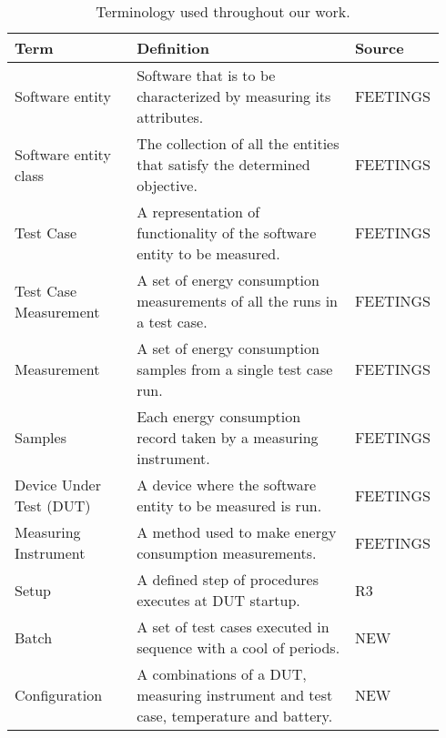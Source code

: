 
\begin{table}[ht]
    \begin{tabular}{| p{0.29\linewidth} | p{0.5\linewidth}| p{0.15\linewidth}|}
        \hline
        \textbf{Term}           & \textbf{Definition}                                                       & \textbf{Source} \\ \hline
        Software entity         & Software that is to be characterized by measuring its attributes.         & FEETINGS\cite{GarciaFEETINGS}        \\ \hline
        Software entity class   & The collection of all the entities that satisfy the determined objective. & FEETINGS\cite{GarciaFEETINGS}        \\ \hline
        Test Case               & A representation of functionality of the software entity to be measured.  & FEETINGS\cite{GarciaFEETINGS}         \\ \hline
        Test Case Measurement    & A set of energy consumption measurements of all the runs in a test case.  & FEETINGS\cite{GarciaFEETINGS}         \\ \hline
        Measurement             & A set of energy consumption samples from a single test case run.       & FEETINGS\cite{GarciaFEETINGS}         \\ \hline
        Samples                 & Each energy consumption record taken by a measuring instrument.           & FEETINGS\cite{GarciaFEETINGS}         \\ \hline
        Device Under Test (DUT) & A device where the software entity to be measured is run.                 & FEETINGS\cite{GarciaFEETINGS}         \\ \hline
        Measuring Instrument    & A method used to make energy consumption measurements.                    & FEETINGS\cite{GarciaFEETINGS}         \\ \hline
        Setup                   & A defined step of procedures executes at DUT startup.                     & R3\cite{Bokhari2020r3}              \\ \hline
        Batch\                  & A set of test cases executed in sequence with a cool of periods.            & NEW             \\ \hline
        Configuration\          & A combinations of a DUT, measuring instrument and test case, temperature and battery.            & NEW             \\ \hline
    
    \end{tabular}
    \caption{Terminology used throughout our work.}
    \label{tab:TerminologyAlert}
    \end{table}